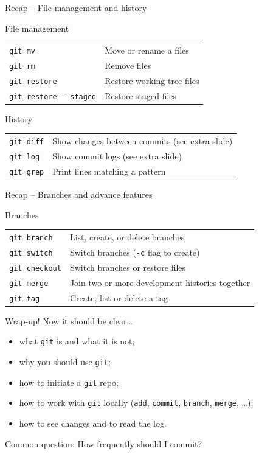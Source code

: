 \documentclass[aspectratio=169]{beamer}
\newcommand{\code}[1]{\texttt{\color{mygreen}#1}}
\begin{document}
\begin{frame}
  {Recap -- File management and history}
  \begin{block}{File management}
  \begin{tabular}{ll}
    \code{git mv}      & Move or rename a files\\
    \code{git rm}      & Remove files\\
    \code{git restore} & Restore working tree files\\
    \code{git restore -{}-staged} & Restore staged files\\
  \end{tabular}
  \end{block}

  \vfill
  \begin{block}{History}
  \begin{tabular}{ll}
    \code{git diff}   & Show changes between commits (see extra slide)\\
    \code{git log}    & Show commit logs (see extra slide)\\
    \code{git grep}   & Print lines matching a pattern\\
  \end{tabular}
  \end{block}

\end{frame}

\begin{frame}
  {Recap -- Branches and advance features}
  \begin{block}{Branches}
  \begin{tabular}{ll}
    \code{git branch}   & List, create, or delete branches\\
    \code{git switch}   & Switch branches (\code{-c} flag to create)\\
    \code{git checkout} & Switch branches or restore files\\
    \code{git merge}    & Join two or more development histories together\\
    \code{git tag}      & Create, list or delete a tag\\
  \end{tabular}
  \end{block}

\end{frame}


\begin{frame}
  {Wrap-up! Now it should be clear\ldots}
  \begin{itemize}\itemsep0.2cm
    \item what \code{git} is and what it is not;
    \item why you should use \code{git};
    \item how to initiate a \code{git} repo;
    \item how to work with \code{git} locally (\code{add}, \code{commit},
      \code{branch}, \code{merge}, \ldots);
    \item how to see changes and to read the log.
  \end{itemize}

  \vfill

  Common question: \alert{How frequently should I commit?}
\end{frame}
\end{document}
